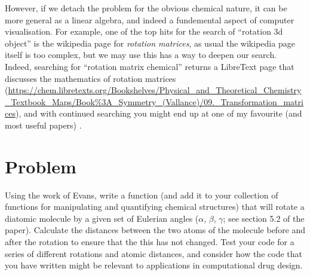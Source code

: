 \documentclass[a4paper]{article}
\begin{document}
However, if we detach the problem for the obvious chemical nature, it can be more general as a linear algebra, and indeed a fundemental aspect of computer visualisation.
For example, one of the top hits for the search of ``rotation 3d object'' is the wikipedia page for \emph{rotation matrices}, as usual the wikipedia page itself is too complex, but we may use this has a way to deepen our search.
Indeed, searching for ``rotation matrix chemical'' returns a LibreText page that discusses the mathematics of rotation matrices (\url{https://chem.libretexts.org/Bookshelves/Physical_and_Theoretical_Chemistry_Textbook_Maps/Book%3A_Symmetry_(Vallance)/09._Transformation_matrices}), and with continued searching you might end up at one of my favourite (and most useful papers) \cite{Evans2001}.

\section{Problem}
Using the work of Evans\cite{Evans2001}, write a function (and add it to your collection of functions for manipulating and quantifying chemical structures) that will rotate a diatomic molecule by a given set of Eulerian angles ($\alpha$, $\beta$, $\gamma$; see section 5.2 of the paper).
Calculate the distances between the two atoms of the molecule before and after the rotation to ensure that the this has not changed.
Test your code for a series of different rotations and atomic distances, and consider how the code that you have written might be relevant to applications in computational drug design.



\end{document}
